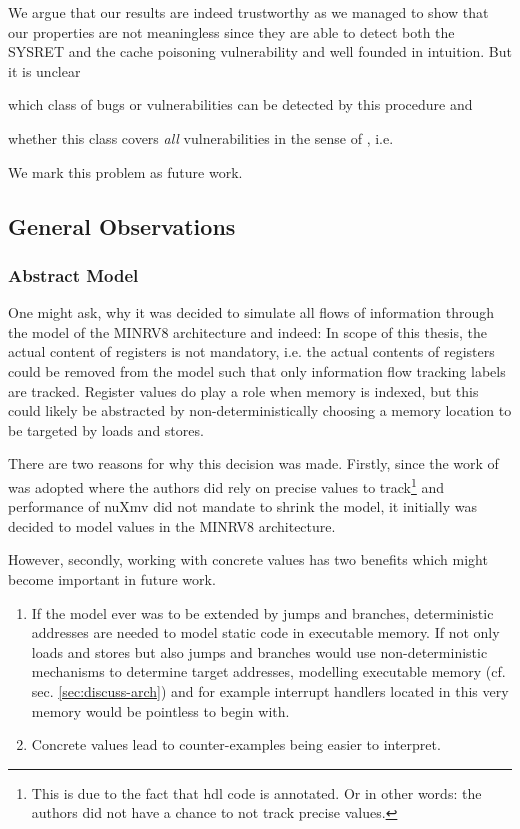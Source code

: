 We argue that our results are indeed trustworthy as we managed to show that our properties are not meaningless since they are able to detect both the SYSRET and the cache poisoning vulnerability and well founded in intuition.
But it is unclear
\begin{enumerate*}[label=\alph*)]
    \item which class of bugs or vulnerabilities can be detected by this procedure and
    \item whether this class covers \textit{all} vulnerabilities in the sense of \citeauthor{Piano}, i.e. 
\end{enumerate*}
We mark this problem as future work.

\subsection{General Observations}
\label{sec:discuss-observations}


\subsubsection{Abstract Model}

One might ask, why it was decided to simulate all flows of information through the model of the MINRV8 architecture and indeed: In scope of this thesis, the actual content of registers is not mandatory, i.e. the actual contents of registers could be removed from the model such that only information flow tracking labels are tracked.
Register values do play a role when memory is indexed, but this could likely be abstracted by non-deterministically choosing a memory location to be targeted by loads and stores.

There are two reasons for why this decision was made.
Firstly, since the work of \citeauthor{Ferraiuolo17} \cite{Ferraiuolo17} was adopted where the authors did rely on precise values to track\footnote{%
    This is due to the fact that \gls{hdl} code is annotated.
    Or in other words: the authors did not have a chance to not track precise values.
} and performance of nuXmv did not mandate to shrink the model, it initially was decided to model values in the MINRV8 architecture.

However, secondly, working with concrete values has two benefits which might become important in future work.
\begin{enumerate}
    \item If the model ever was to be extended by jumps and branches, deterministic addresses are needed to model static code in executable memory.
    If not only loads and stores but also jumps and branches would use non-deterministic mechanisms to determine target addresses, modelling executable memory (cf. sec. \ref{sec:discuss-arch}) and for example interrupt handlers located in this very memory would be pointless to begin with.
    \item Concrete values lead to counter-examples being easier to interpret.
\end{enumerate}

